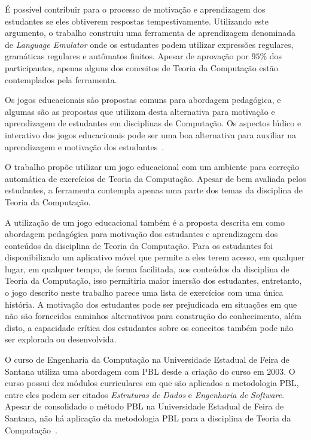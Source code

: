 É possível contribuir para o processo de
motivação e aprendizagem dos estudantes se
eles obtiverem respostas
tempestivamente.
Utilizando este argumento, o
trabalho \cite{vieira2003language} construiu
uma ferramenta de aprendizagem denominada
de \textit{Language Emulator} onde os estudantes
podem utilizar expressões regulares, gramáticas
regulares e autômatos finitos.
Apesar de aprovação por $95\%$ dos
participantes, apenas alguns dos conceitos de Teoria
da Computação estão contemplados pela ferramenta.

Os jogos educacionais são propostas comuns para abordagem
pedagógica, e algumas são as propostas que utilizam
desta alternativa para motivação e aprendizagem
de estudantes em disciplinas de Computação.
Os aspectos lúdico e interativo dos jogos educacionais
pode ser uma boa alternativa para auxiliar na aprendizagem
e motivação dos estudantes~\cite{silva2010automata}.

O trabalho \cite{leite2014montanha} propõe utilizar
um jogo educacional com um ambiente para correção
automática de exercícios de Teoria da Computação.
Apesar de bem avaliada pelos estudantes, a ferramenta
contempla apenas uma parte dos temas da disciplina
de Teoria da Computação.

A utilização de um jogo educacional também é a
proposta descrita em \cite{de2011jogo}
como abordagem pedagógica para motivação dos estudantes
e aprendizagem dos conteúdos da disciplina de Teoria da
Computação.
Para os estudantes foi disponibilizado um aplicativo
móvel que permite a eles terem acesso, em qualquer lugar,
em qualquer tempo, de forma facilitada, aos conteúdos
da disciplina de Teoria da Computação, isso permitiria
maior imersão dos estudantes, entretanto, o jogo
descrito neste trabalho parece uma lista de
exercícios com uma única história.
A motivação dos estudantes pode ser prejudicada
em situações em que não são fornecidos caminhos
alternativos para construção do conhecimento,
além disto, a capacidade crítica dos estudantes
sobre os conceitos também pode não ser explorada
ou desenvolvida.

O curso de Engenharia da Computação na
Universidade Estadual de Feira de Santana utiliza
uma abordagem com PBL desde a criação do curso em
2003.
O curso possui dez módulos curriculares em que são
aplicados a metodologia PBL, entre eles podem ser citados
\textit{Estruturas de Dados} e
\textit{Engenharia de Software}.
Apesar de consolidado o método PBL na
Universidade Estadual de Feira de Santana,
não há aplicação da metodologia PBL para a disciplina de
Teoria da Computação~\cite{dospensamento}.
